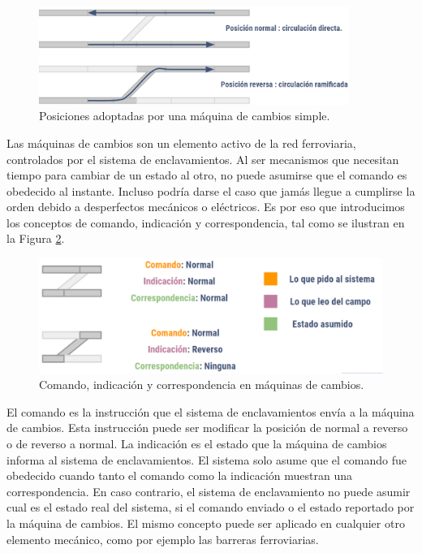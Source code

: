    \begin{figure}[!h]
        \centering
        \includegraphics[width=0.9\textwidth]{Figuras/cambio_3.PNG}
        \centering\caption{Posiciones adoptadas por una máquina de cambios simple.}
        \label{fig:cambios_3}
    \end{figure}

    Las máquinas de cambios son un elemento activo de la red ferroviaria, controlados por el sistema de enclavamientos. Al ser mecanismos que necesitan tiempo para cambiar de un estado al otro, no puede asumirse que el comando es obedecido al instante. Incluso podría darse el caso que jamás llegue a cumplirse la orden debido a desperfectos mecánicos o eléctricos. Es por eso que introducimos los conceptos de comando, indicación y correspondencia, tal como se ilustran en la Figura \ref{fig:cambios_4}.

    \begin{figure}[!h]
        \centering
        \includegraphics[width=1\textwidth]{Figuras/cambios}
        \centering\caption{Comando, indicación y correspondencia en máquinas de cambios.}
        \label{fig:cambios_4}
    \end{figure}
    
    El comando es la instrucción que el sistema de enclavamientos envía a la máquina de cambios. Esta instrucción puede ser modificar la posición de normal a reverso o de reverso a normal. La indicación es el estado que la máquina de cambios informa al sistema de enclavamientos. El sistema solo asume que el comando fue obedecido cuando tanto el comando como la indicación muestran una correspondencia. En caso contrario, el sistema de enclavamiento no puede asumir cual es el estado real del sistema, si el comando enviado o el estado reportado por la máquina de cambios. El mismo concepto puede ser aplicado en cualquier otro elemento mecánico, como por ejemplo las barreras ferroviarias.

